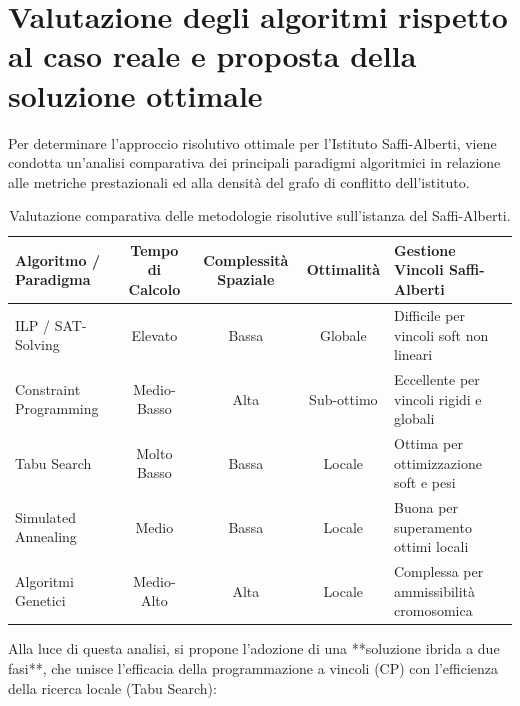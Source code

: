 \section{Valutazione degli algoritmi rispetto al caso reale e proposta della soluzione ottimale}
\label{sec:valutazione-soluzione-saffi}

Per determinare l'approccio risolutivo ottimale per l'Istituto Saffi-Alberti, viene condotta un'analisi comparativa dei principali paradigmi algoritmici in relazione alle metriche prestazionali ed alla densità del grafo di conflitto dell'istituto.

\begin{table}[htbp]
\centering
\begin{tabular}{|l|c|c|c|p{4cm}|}
\hline
\textbf{Algoritmo / Paradigma} & \textbf{Tempo di Calcolo} & \textbf{Complessità Spaziale} & \textbf{Ottimalità} & \textbf{Gestione Vincoli Saffi-Alberti} \\ \hline
ILP / SAT-Solving              & Elevato                   & Bassa                         & Globale             & Difficile per vincoli soft non lineari \\ \hline
Constraint Programming         & Medio-Basso               & Alta                          & Sub-ottimo          & Eccellente per vincoli rigidi e globali \\ \hline
Tabu Search                    & Molto Basso               & Bassa                         & Locale              & Ottima per ottimizzazione soft e pesi  \\ \hline
Simulated Annealing            & Medio                     & Bassa                         & Locale              & Buona per superamento ottimi locali    \\ \hline
Algoritmi Genetici             & Medio-Alto                & Alta                          & Locale              & Complessa per ammissibilità cromosomica \\ \hline
\end{tabular}
\caption{Valutazione comparativa delle metodologie risolutive sull'istanza del Saffi-Alberti.}
\label{tab:confronto-metodologie}
\end{table}

Alla luce di questa analisi, si propone l'adozione di una **soluzione ibrida a due fasi**, che unisce l'efficacia della programmazione a vincoli (CP) con l'efficienza della ricerca locale (Tabu Search):

